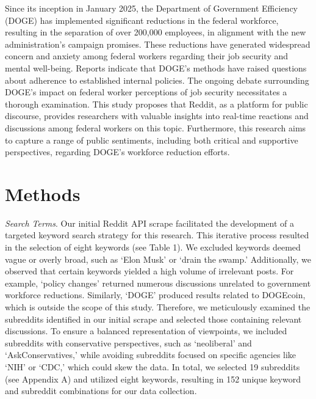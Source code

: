 \documentclass[
  12pt]{article}
\begin{document}
Since its inception in January 2025, the Department of Government
Efficiency (DOGE) has implemented significant reductions in the federal
workforce, resulting in the separation of over 200,000 employees, in
alignment with the new administration's campaign promises. These
reductions have generated widespread concern and anxiety among federal
workers regarding their job security and mental well-being. Reports
indicate that DOGE's methods have raised questions about adherence to
established internal policies. The ongoing debate surrounding DOGE's
impact on federal worker perceptions of job security necessitates a
thorough examination. This study proposes that Reddit, as a platform for
public discourse, provides researchers with valuable insights into
real-time reactions and discussions among federal workers on this topic.
Furthermore, this research aims to capture a range of public sentiments,
including both critical and supportive perspectives, regarding DOGE's
workforce reduction efforts.

\section{Methods}\label{sec-meth}

\emph{Search Terms}. Our initial Reddit API scrape facilitated the
development of a targeted keyword search strategy for this research.
This iterative process resulted in the selection of eight keywords (see
Table 1). We excluded keywords deemed vague or overly broad, such as
`Elon Musk' or `drain the swamp.' Additionally, we observed that certain
keywords yielded a high volume of irrelevant posts. For example, `policy
changes' returned numerous discussions unrelated to government workforce
reductions. Similarly, `DOGE' produced results related to DOGEcoin,
which is outside the scope of this study. Therefore, we meticulously
examined the subreddits identified in our initial scrape and selected
those containing relevant discussions. To ensure a balanced
representation of viewpoints, we included subreddits with conservative
perspectives, such as `neoliberal' and `AskConservatives,' while
avoiding subreddits focused on specific agencies like `NIH' or `CDC,'
which could skew the data. In total, we selected 19 subreddits (see
Appendix A) and utilized eight keywords, resulting in 152 unique keyword
and subreddit combinations for our data collection.
\end{document}
